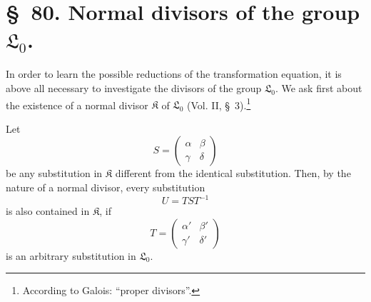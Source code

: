 \documentclass[11pt]{article}
\newcommand{\Lzero}{\mathfrak L_0}
\newcommand{\Kgrp}{\mathfrak K}
\begin{document}
\section*{\S~80. Normal divisors of the group $\Lzero$.}

In order to learn the possible reductions of the transformation equation, it is above all necessary to investigate the divisors of the group $\Lzero$. We ask first about the existence of a normal divisor $\Kgrp$ of $\Lzero$ (Vol. II, \S~3).\footnote{According to Galois: ``proper divisors''.}

Let
\begin{equation}
 S=\begin{pmatrix}\alpha&\beta\\\gamma&\delta\end{pmatrix}
\tag{1}
\end{equation}
be any substitution in $\Kgrp$ different from the identical substitution. Then, by the nature of a normal divisor, every substitution
\begin{equation}
 U=TST^{-1}
\tag{2}
\end{equation}
is also contained in $\Kgrp$, if
\begin{equation}
 T=\begin{pmatrix}\alpha'&\beta'\\\gamma'&\delta'\end{pmatrix}
\tag{3}
\end{equation}
is an arbitrary substitution in $\Lzero$.
\end{document}
